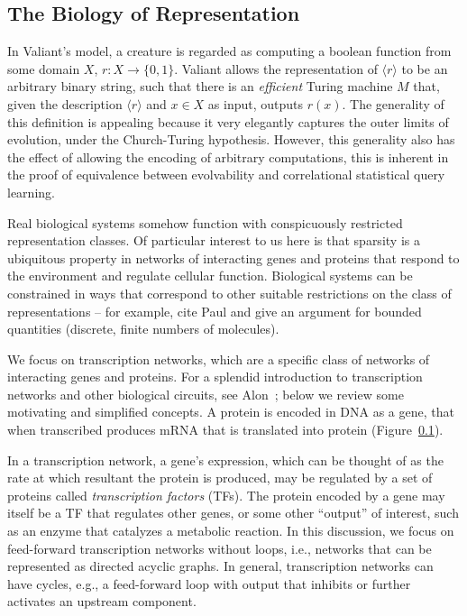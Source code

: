 \subsection{The Biology of Representation}

In Valiant's model, a creature is regarded as computing a boolean function from
some domain $X$, $r : X \rightarrow \{0, 1\}$. Valiant allows the representation
of $\langle r \rangle$ to be an arbitrary binary string, such that there is an
\emph{efficient} Turing machine $M$ that, given the description $\langle r
\rangle$ and $x \in X$ as input, outputs $r(x)$. The generality of this
definition is appealing because it very elegantly captures the outer limits of
evolution, under the Church-Turing hypothesis. However, this generality also has
the effect of allowing the encoding of arbitrary computations, this is
inherent in the proof of equivalence between evolvability and correlational
statistical query learning.

Real biological systems somehow function with conspicuously restricted
representation classes. Of particular interest to us here is that sparsity is a
ubiquitous property in networks of interacting genes and proteins that respond
to the environment and regulate cellular function.
Biological systems can be constrained in ways that correspond to other suitable
restrictions on the class of representations -- for example, cite Paul and give
an argument for bounded quantities (discrete, finite numbers of molecules).

We focus on transcription networks, which are a specific class of
networks of interacting genes and proteins. For a splendid introduction to
transcription networks and other biological circuits, see Alon~\cite{alon};
below we review some motivating and simplified concepts.
A protein is encoded in DNA as a gene, that when transcribed produces mRNA
that is translated into protein (Figure~\ref{}).

In a transcription network, a gene's expression, which can be
thought of as the rate at which resultant the protein is produced,
may be regulated by a set of proteins called \emph{transcription factors} (TFs).
The protein encoded by a gene may itself be a TF that regulates other genes,
or some other ``output'' of interest, such as an enzyme that catalyzes a
metabolic reaction.
In this discussion, we focus on feed-forward transcription networks without
loops, i.e., networks that can be represented as directed acyclic graphs.
In general, transcription networks can have cycles, e.g., a feed-forward loop
with output that inhibits or further activates an upstream component.

